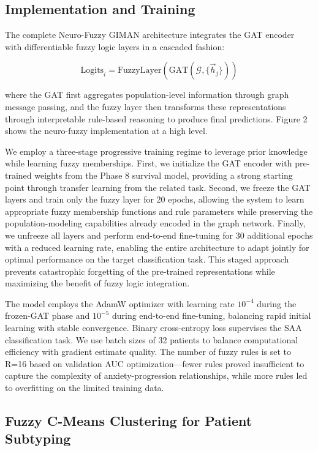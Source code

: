 \documentclass[journal,twoside,web]{ieeecolor}
\begin{document}
\subsection{Implementation and Training}

The complete Neuro-Fuzzy GIMAN architecture integrates the GAT encoder with differentiable fuzzy logic layers in a cascaded fashion:

\begin{equation}
\text{Logits}_i = \text{FuzzyLayer}(\text{GAT}(\mathcal{G}, \{\vec{h}_j\}))
\end{equation}

where the GAT first aggregates population-level information through graph message passing, and the fuzzy layer then transforms these representations through interpretable rule-based reasoning to produce final predictions. Figure 2 shows the neuro-fuzzy implementation at a high level.

We employ a three-stage progressive training regime to leverage prior knowledge while learning fuzzy memberships. First, we initialize the GAT encoder with pre-trained weights from the Phase 8 survival model, providing a strong starting point through transfer learning from the related task. Second, we freeze the GAT layers and train only the fuzzy layer for 20 epochs, allowing the system to learn appropriate fuzzy membership functions and rule parameters while preserving the population-modeling capabilities already encoded in the graph network. Finally, we unfreeze all layers and perform end-to-end fine-tuning for 30 additional epochs with a reduced learning rate, enabling the entire architecture to adapt jointly for optimal performance on the target classification task. This staged approach prevents catastrophic forgetting of the pre-trained representations while maximizing the benefit of fuzzy logic integration.

The model employs the AdamW optimizer with learning rate $10^{-4}$ during the frozen-GAT phase and $10^{-5}$ during end-to-end fine-tuning, balancing rapid initial learning with stable convergence. Binary cross-entropy loss supervises the SAA classification task. We use batch sizes of 32 patients to balance computational efficiency with gradient estimate quality. The number of fuzzy rules is set to R=16 based on validation AUC optimization---fewer rules proved insufficient to capture the complexity of anxiety-progression relationships, while more rules led to overfitting on the limited training data.

\subsection{Fuzzy C-Means Clustering for Patient Subtyping}
\end{document}
